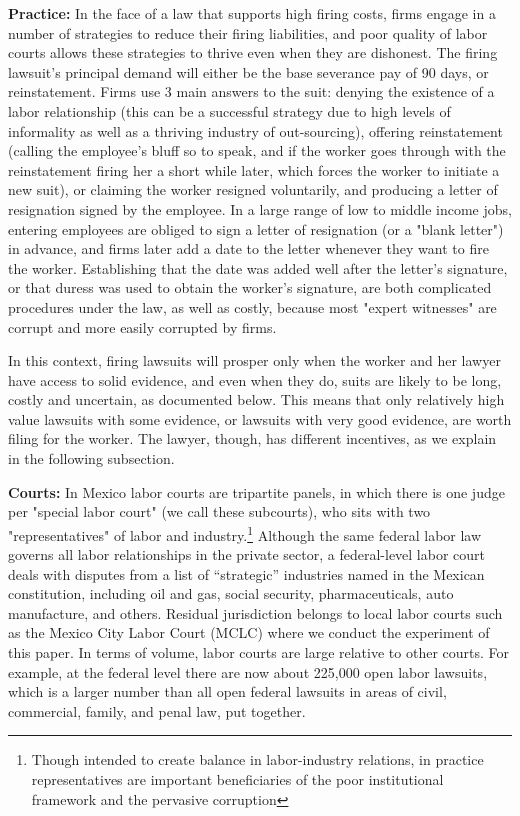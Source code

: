 \documentclass[11pt]{article}
\begin{document}
\textbf{Practice:} In the face of a law that supports high firing costs, firms engage in a number of strategies to reduce their firing liabilities, and poor quality of labor courts allows these strategies to thrive even when they are dishonest. The firing lawsuit's principal demand will either be the base severance pay of 90 days, or reinstatement. Firms use 3 main answers to the suit: denying the existence of a labor relationship (this can be a successful strategy due to high levels of informality as well as a thriving industry of out-sourcing), offering reinstatement (calling the employee's bluff so to speak, and if the worker goes through with the reinstatement firing her a short while later, which forces the worker to initiate a new suit), or claiming the worker resigned voluntarily, and producing a letter of resignation signed by the employee. In a large range of low to middle income jobs, entering employees are obliged to sign a letter of resignation (or a "blank letter") in advance, and firms later add a date to the letter whenever they want to fire the worker. Establishing that the date was added well after the letter's signature, or that duress was used to obtain the worker's signature, are both complicated procedures under the law, as well as costly, because most "expert witnesses" are corrupt and more easily corrupted by firms. 

In this context, firing lawsuits will prosper only when the worker and her lawyer have access to solid evidence, and even when they do, suits are likely to be long, costly and uncertain, as documented below. This means that only relatively high value lawsuits with some evidence, or lawsuits with very good evidence, are worth filing for the worker. The lawyer, though, has different incentives, as we explain in the following subsection.  

\textbf{Courts:} In Mexico labor courts are tripartite panels, in which there is one judge per "special labor court" (we call these subcourts), who sits with two "representatives" of labor and industry.\footnote{Though intended to create balance in labor-industry relations, in practice representatives are important beneficiaries of the poor institutional framework and the pervasive corruption} Although the same federal labor law governs all labor relationships in the private sector, a federal-level labor court deals with disputes from a list of ``strategic'' industries named in the Mexican constitution, including oil and gas, social security, pharmaceuticals, auto manufacture, and others. Residual jurisdiction belongs to local labor courts such as the Mexico City Labor Court (MCLC) where we conduct the experiment of this paper. In terms of volume, labor courts are large relative to other courts. For example, at the federal level there are now about 225,000 open labor lawsuits, which is a larger number than all open federal lawsuits in areas of civil, commercial, family, and penal law, put together. 
\end{document}

